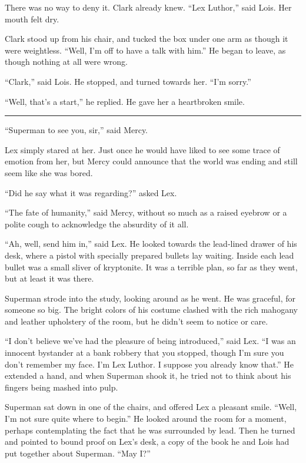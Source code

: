 There was no way to deny it. Clark already knew. ``Lex Luthor,'' said
Lois. Her mouth felt dry.

Clark stood up from his chair, and tucked the box under one arm as
though it were weightless. ``Well, I'm off to have a talk with him.'' He
began to leave, as though nothing at all were wrong.

``Clark,'' said Lois. He stopped, and turned towards her. ``I'm sorry.''

``Well, that's a start,'' he replied. He gave her a heartbroken smile.

\begin{center}\rule{0.5\linewidth}{0.5pt}\end{center}

``Superman to see you, sir,'' said Mercy.

Lex simply stared at her. Just once he would have liked to see some
trace of emotion from her, but Mercy could announce that the world was
ending and still seem like she was bored.

``Did he say what it was regarding?'' asked Lex.

``The fate of humanity,'' said Mercy, without so much as a raised
eyebrow or a polite cough to acknowledge the absurdity of it all.

``Ah, well, send him in,'' said Lex. He looked towards the lead‐lined
drawer of his desk, where a pistol with specially prepared bullets lay
waiting. Inside each lead bullet was a small sliver of kryptonite. It
was a terrible plan, so far as they went, but at least it was there.

Superman strode into the study, looking around as he went. He was
graceful, for someone so big. The bright colors of his costume clashed
with the rich mahogany and leather upholstery of the room, but he didn't
seem to notice or care.

``I don't believe we've had the pleasure of being introduced,'' said
Lex. ``I was an innocent bystander at a bank robbery that you stopped,
though I'm sure you don't remember my face. I'm Lex Luthor. I suppose
you already know that.'' He extended a hand, and when Superman shook it,
he tried not to think about his fingers being mashed into pulp.

Superman sat down in one of the chairs, and offered Lex a pleasant
smile. ``Well, I'm not sure quite where to begin.'' He looked around the
room for a moment, perhaps contemplating the fact that he was surrounded
by lead. Then he turned and pointed to bound proof on Lex's desk, a copy
of the book he and Lois had put together about Superman. ``May I?''

